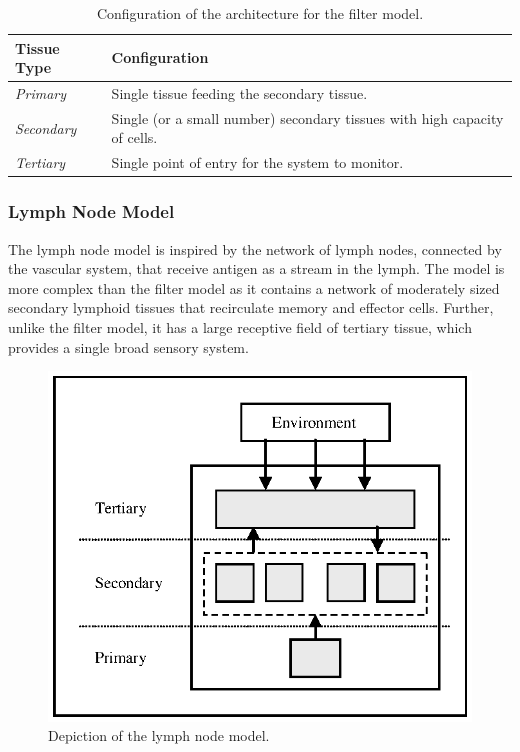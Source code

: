 \begin{table}[ht]
	\centering\small
		\begin{tabular}{ll}
		\toprule
		\textbf{Tissue Type} & \textbf{Configuration} \\ 
		\toprule
		\emph{Primary} & Single tissue feeding the secondary tissue. \\ 
		\emph{Secondary} & Single (or a small number) secondary tissues with high capacity of cells. \\ 
		\emph{Tertiary} & Single point of entry for the system to monitor. \\ 
		\bottomrule
		\end{tabular}	
	\caption{Configuration of the architecture for the filter model.}
	\label{tab:tissue:architectures:filter}
\end{table}

%
%
\subsubsection{Lymph Node Model}
The lymph node model is inspired by the network of lymph nodes, connected by the vascular system, that receive antigen as a stream in the lymph. The model is more complex than the filter model as it contains a network of moderately sized secondary lymphoid tissues that recirculate memory and effector cells. Further, unlike the filter model, it has a large receptive field of tertiary tissue, which provides a single broad sensory system.

\begin{figure}[ht]
	\centering
	\includegraphics[scale=0.75]{Tissues/tissues-models-lymphnode}
	\caption{Depiction of the lymph node model.}
	\label{pic:tissues:architecture:lymphnode}
\end{figure}

